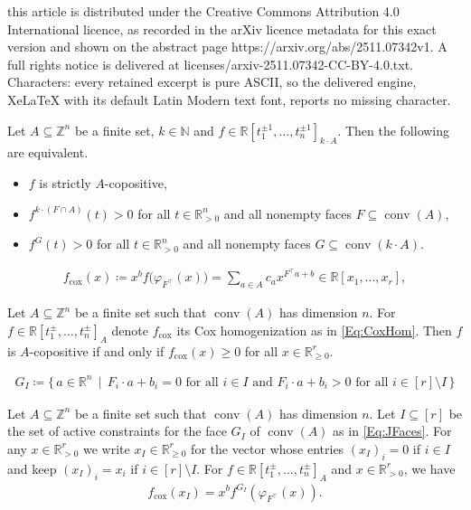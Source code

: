 \documentclass[10pt,a4paper]{amsart}
\DeclareMathOperator{\conv}{conv}
\newcommand{\RR}{\mathbb{R}}
\newcommand{\cox}{\mathrm{cox}}
\begin{document}
this article is distributed under the Creative Commons Attribution 4.0 International licence, as recorded in the arXiv licence metadata for this exact version and shown on the abstract page https://arxiv.org/abs/2511.07342v1. A full rights notice is delivered at licenses/arxiv-2511.07342-CC-BY-4.0.txt. Characters: every retained excerpt is pure ASCII, so the delivered engine, XeLaTeX with its default Latin Modern text font, reports no missing character.
\begin{proposition}
\label{Prop:InteriorOfCA_bis}
Let $A \subseteq \mathbb{Z}^n$ be a finite set, $k \in \mathbb{N}$ and $f \in \RR[t_1^{\pm 1}, \dots , t_n^{\pm 1}]_{k \cdot A}$. 
Then the following are equivalent.
\begin{itemize}
    \item[(ii)] $f$ is strictly  $A$-copositive,
    \item[(iii)]  $f^{k\cdot(F \cap A)}(t) > 0$ for all $t \in \mathbb{R}^n_{>0}$ and all nonempty faces $F \subseteq \conv(A)$,
    \item[(iv)]  $f^G(t) > 0$ for all $t \in \mathbb{R}^n_{>0}$ and all nonempty faces $G \subseteq \conv(k \cdot A)$.
\end{itemize}
\end{proposition}

\begin{align}
\label{Eq:CoxHom}
    f_\cox(x)\coloneqq x^b f\big(\varphi_{F^\top}(x)\big) = \sum_{a\in A}c_a x^{F^\top a+b}\in \RR[x_1,\dots,x_r],
\end{align}

\begin{lemma}
\label{Lemma:CoxSparseCopisitive}
Let $A \subseteq \mathbb{Z}^n$ be a finite set such that $\conv(A)$ has dimension $n$. For $f \in \RR[t_1^\pm , \dots, t_n^\pm]_A$ denote $f_{\cox}$ its Cox homogenization as in \eqref{Eq:CoxHom}. Then $f$ is $A$-copositive if and only if $f_\cox(x) \geq 0$ for all $x \in \mathbb{R}^r_{\geq0}$. 
\end{lemma}

\begin{align}
\label{Eq:JFaces}
 G_I \coloneqq \{ \, a \in \RR^n \, \mid \, F_i \cdot a + b_i = 0 \text{ for all } i \in I \text{ and }  F_i \cdot a + b_i > 0 \text{ for all } i \in [r] \setminus I \, \}
 \end{align}

\begin{lemma}
\label{lem:coxtruncation}
Let $A \subseteq \mathbb{Z}^n$ be a finite set such that $\conv(A)$ has dimension $n$.
Let $I \subseteq [r]$ be the set of active constraints for the face $G_I$ of $\conv(A)$ as in \eqref{Eq:JFaces}.
For any $x \in \RR^r_{>0}$ we write $x_I \in \mathbb{R}^r_{\geq0}$ for the vector whose entries $(x_I)_i = 0$ if $i \in I$ and keep  $(x_I)_i = x_i$ if $i \in [r] \setminus I$.
For $f \in \RR[t_1^\pm , \dots, t_n^\pm]_A$ and $x\in \RR^r_{>0}$, we have
\begin{align*}
        f_{\cox}(x_I)=x^bf^{G_I}(\varphi_{F^\top}(x)).
    \end{align*}
\end{lemma}
\end{document}
